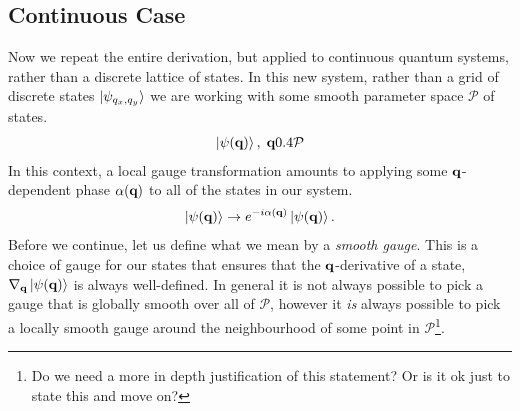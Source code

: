 \subsection{Continuous Case}\label{sec:continuous_case}

Now we repeat the entire derivation, but applied to continuous quantum systems, rather than a discrete lattice of states. In this new system, rather than a grid of discrete states $\ket{\psi_{q_x, q_y}}$ we are working with some smooth parameter space $\mathcal{P}$ of states.
\begin{align}
    \ket{\psi(\bf q)}, \; \bf q \in \mathcal{P}
\end{align}
In this context, a local gauge transformation amounts to applying some $\bf q$-dependent phase $\alpha(\bf q)$ to all of the states in our system.
\begin{align}
	\ket{\psi(\bf q)} \rightarrow e^{-i\alpha(\bf q)}\ket{\psi(\bf q)}.
\end{align}
Before we continue, let us define what we mean by a \textit{smooth gauge}. This is a choice of gauge for our states that ensures that the $\bf q$-derivative of a state, $\nabla_{\bf q}\ket{\psi(\bf q)}$ is always well-defined. In general it is not always possible to pick a gauge that is globally smooth over all of $\mathcal{P}$, however it \textit{is} always possible to pick a locally smooth gauge around the neighbourhood of some point in $\mathcal{P}$\footnote{Do we need a more in depth justification of this statement? Or is it ok just to state this and move on?}.

\par

